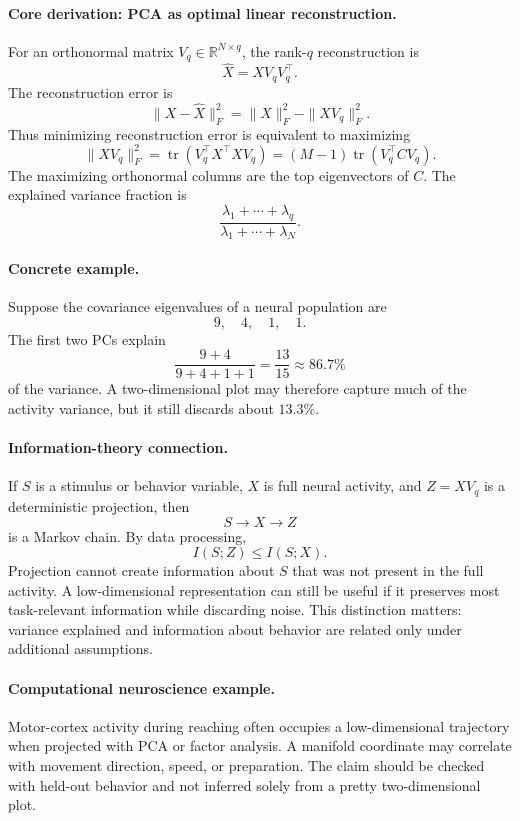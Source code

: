 \paragraph{Core derivation: PCA as optimal linear reconstruction.}
For an orthonormal matrix \(V_q\in\mathbb R^{N\times q}\), the rank-\(q\) reconstruction is
\[
\widehat X=XV_qV_q^\top.
\]
The reconstruction error is
\[
\|X-\widehat X\|_F^2
=\|X\|_F^2-\|XV_q\|_F^2.
\]
Thus minimizing reconstruction error is equivalent to maximizing
\[
\|XV_q\|_F^2
=\operatorname{tr}(V_q^\top X^\top X V_q)
=(M-1)\operatorname{tr}(V_q^\top C V_q).
\]
The maximizing orthonormal columns are the top eigenvectors of \(C\). The explained variance fraction is
\[
\frac{\lambda_1+\cdots+\lambda_q}{\lambda_1+\cdots+\lambda_N}.
\]

\paragraph{Concrete example.}
Suppose the covariance eigenvalues of a neural population are
\[
9,\quad 4,\quad 1,\quad 1.
\]
The first two PCs explain
\[
\frac{9+4}{9+4+1+1}=\frac{13}{15}\approx86.7\%
\]
of the variance. A two-dimensional plot may therefore capture much of the activity variance, but it still discards about \(13.3\%\).

\paragraph{Information-theory connection.}
If \(S\) is a stimulus or behavior variable, \(X\) is full neural activity, and \(Z=XV_q\) is a deterministic projection, then
\[
S\to X\to Z
\]
is a Markov chain. By data processing,
\[
\boxed{I(S;Z)\leq I(S;X).}
\]
Projection cannot create information about \(S\) that was not present in the full activity. A low-dimensional representation can still be useful if it preserves most task-relevant information while discarding noise. This distinction matters: variance explained and information about behavior are related only under additional assumptions.

\paragraph{Computational neuroscience example.}
Motor-cortex activity during reaching often occupies a low-dimensional trajectory when projected with PCA or factor analysis. A manifold coordinate may correlate with movement direction, speed, or preparation. The claim should be checked with held-out behavior and not inferred solely from a pretty two-dimensional plot.

